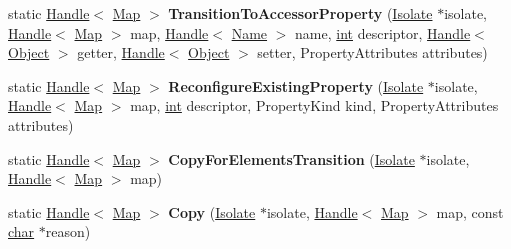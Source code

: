 \begin{DoxyCompactItemize}
\item 
\mbox{\label{classv8_1_1internal_1_1Map_af12850369dafa2c6ddde70b3ba3c764c}} 
static \mbox{\hyperlink{classv8_1_1internal_1_1Handle}{Handle}}$<$ \mbox{\hyperlink{classv8_1_1internal_1_1Map}{Map}} $>$ {\bfseries Transition\+To\+Accessor\+Property} (\mbox{\hyperlink{classv8_1_1internal_1_1Isolate}{Isolate}} $\ast$isolate, \mbox{\hyperlink{classv8_1_1internal_1_1Handle}{Handle}}$<$ \mbox{\hyperlink{classv8_1_1internal_1_1Map}{Map}} $>$ map, \mbox{\hyperlink{classv8_1_1internal_1_1Handle}{Handle}}$<$ \mbox{\hyperlink{classv8_1_1internal_1_1Name}{Name}} $>$ name, \mbox{\hyperlink{classint}{int}} descriptor, \mbox{\hyperlink{classv8_1_1internal_1_1Handle}{Handle}}$<$ \mbox{\hyperlink{classv8_1_1internal_1_1Object}{Object}} $>$ getter, \mbox{\hyperlink{classv8_1_1internal_1_1Handle}{Handle}}$<$ \mbox{\hyperlink{classv8_1_1internal_1_1Object}{Object}} $>$ setter, Property\+Attributes attributes)
\item 
\mbox{\label{classv8_1_1internal_1_1Map_a1bf37a8279bee552032bf50c52de414c}} 
static \mbox{\hyperlink{classv8_1_1internal_1_1Handle}{Handle}}$<$ \mbox{\hyperlink{classv8_1_1internal_1_1Map}{Map}} $>$ {\bfseries Reconfigure\+Existing\+Property} (\mbox{\hyperlink{classv8_1_1internal_1_1Isolate}{Isolate}} $\ast$isolate, \mbox{\hyperlink{classv8_1_1internal_1_1Handle}{Handle}}$<$ \mbox{\hyperlink{classv8_1_1internal_1_1Map}{Map}} $>$ map, \mbox{\hyperlink{classint}{int}} descriptor, Property\+Kind kind, Property\+Attributes attributes)
\item 
\mbox{\label{classv8_1_1internal_1_1Map_a192f5ac20194662582de87643f50ddc3}} 
static \mbox{\hyperlink{classv8_1_1internal_1_1Handle}{Handle}}$<$ \mbox{\hyperlink{classv8_1_1internal_1_1Map}{Map}} $>$ {\bfseries Copy\+For\+Elements\+Transition} (\mbox{\hyperlink{classv8_1_1internal_1_1Isolate}{Isolate}} $\ast$isolate, \mbox{\hyperlink{classv8_1_1internal_1_1Handle}{Handle}}$<$ \mbox{\hyperlink{classv8_1_1internal_1_1Map}{Map}} $>$ map)
\item 
\mbox{\label{classv8_1_1internal_1_1Map_a277369bab8fbcb504f49e7e12cc75a70}} 
static \mbox{\hyperlink{classv8_1_1internal_1_1Handle}{Handle}}$<$ \mbox{\hyperlink{classv8_1_1internal_1_1Map}{Map}} $>$ {\bfseries Copy} (\mbox{\hyperlink{classv8_1_1internal_1_1Isolate}{Isolate}} $\ast$isolate, \mbox{\hyperlink{classv8_1_1internal_1_1Handle}{Handle}}$<$ \mbox{\hyperlink{classv8_1_1internal_1_1Map}{Map}} $>$ map, const \mbox{\hyperlink{classchar}{char}} $\ast$reason)

\end{DoxyCompactItemize}
